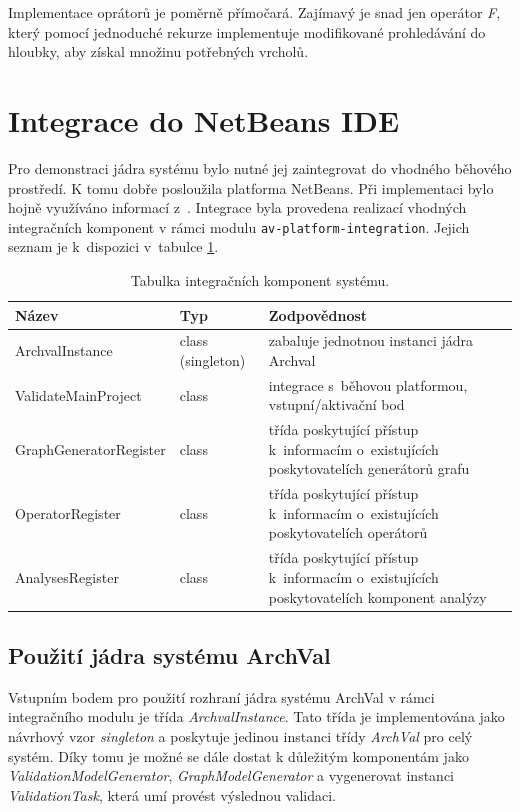 Implementace oprátorů je poměrně přímočará. Zajímavý je snad jen operátor \emph{F}, který pomocí jednoduché rekurze implementuje modifikované prohledávání do hloubky, aby získal množinu potřebných vrcholů.

\section{Integrace do NetBeans IDE}

Pro demonstraci jádra systému bylo nutné jej zaintegrovat do vhodného běhového prostředí. K tomu dobře posloužila platforma NetBeans. Při implementaci bylo hojně využíváno informací z~\cite{netbeans_platform}. Integrace byla provedena realizací vhodných integračních komponent v rámci modulu \verb+av-platform-integration+. Jejich seznam je k~dispozici v~tabulce \ref{implementation-integration_components}.

\begin{table}
  \caption{Tabulka integračních komponent systému. \label{implementation-integration_components}}
  \begin{center}
    \begin{tabular}{ | l | l | p{8cm} | }
      \hline
      \textbf{Název} & \textbf{Typ} & \textbf{Zodpovědnost} \\
      \hline
      \hline
      ArchvalInstance & class (singleton) & zabaluje jednotnou instanci jádra Archval \\ \hline
      ValidateMainProject & class & integrace s~běhovou platformou, vstupní/aktivační bod \\ \hline
      GraphGeneratorRegister & class & třída poskytující přístup k~informacím o~existujících poskytovatelích generátorů grafu \\ \hline
      OperatorRegister & class & třída poskytující přístup k~informacím o~existujících poskytovatelích operátorů \\ \hline
      AnalysesRegister & class & třída poskytující přístup k~informacím o~existujících poskytovatelích komponent analýzy \\ \hline
    \end{tabular}
  \end{center}
\end{table}

\subsection{Použití jádra systému ArchVal}
Vstupním bodem pro použití rozhraní jádra systému ArchVal v rámci integračního modulu je třída \emph{ArchvalInstance}. Tato třída je implementována jako návrhový vzor \emph{singleton} a poskytuje jedinou instanci třídy \emph{ArchVal} pro celý systém. Díky tomu je možné se dále dostat k důležitým komponentám jako \emph{ValidationModelGenerator}, \emph{GraphModelGenerator} a vygenerovat instanci \emph{ValidationTask}, která umí provést výslednou validaci.

